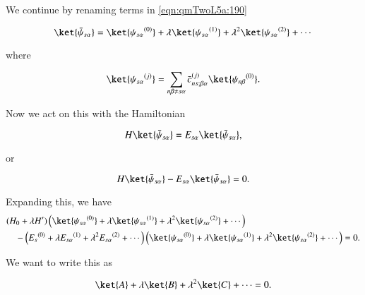
We continue by renaming terms in \ref{eqn:qmTwoL5a:190}

\begin{equation}\label{eqn:qmTwoL5a:300}
\ket{\bar{\psi}_{s \alpha}} 
=
\ket{{\psi_{s \alpha}}^{(0)}} 
+ 
\lambda \ket{{\psi_{s \alpha}}^{(1)}} 
+ 
\lambda^2 \ket{{\psi_{s \alpha}}^{(2)}} 
+ \cdots
\end{equation}

where

\begin{equation}\label{eqn:qmTwoL5a:320}
\ket{{\psi_{s \alpha}}^{(j)}} = \sum_{n\beta \ne s\alpha} {\bar{c}_{ns;\beta \alpha}}^{(j)} \ket{{\psi_{n \beta}}^{(0)}}.
\end{equation}

Now we act on this with the Hamiltonian

\begin{equation}\label{eqn:qmTwoL5a:340}
H \ket{\bar{\psi}_{s \alpha}} = E_{s \alpha} \ket{\bar{\psi}_{s \alpha}},
\end{equation}

or

\begin{equation}\label{eqn:qmTwoL5a:360}
H \ket{\bar{\psi}_{s \alpha}} - E_{s \alpha} \ket{\bar{\psi}_{s \alpha}} = 0.
\end{equation}

Expanding this, we have
\begin{equation}\label{eqn:qmTwoL5a:380}
\begin{aligned}
&(H_0 + \lambda H') 
\left(
\ket{{\psi_{s \alpha}}^{(0)}} 
+ 
\lambda \ket{{\psi_{s \alpha}}^{(1)}} 
+ 
\lambda^2 \ket{{\psi_{s \alpha}}^{(2)}} 
+ \cdots
\right) \\
&\quad - 
\left( {E_s}^{(0)} + \lambda {E_{s \alpha}}^{(1)} + \lambda^2 {E_{s \alpha}}^{(2)} + \cdots \right)
\left(
\ket{{\psi_{s \alpha}}^{(0)}} 
+ 
\lambda \ket{{\psi_{s \alpha}}^{(1)}} 
+ 
\lambda^2 \ket{{\psi_{s \alpha}}^{(2)}} 
+ \cdots
\right)
= 0.
\end{aligned}
\end{equation}

We want to write this as

\begin{equation}\label{eqn:qmTwoL5a:400}
\ket{A} + \lambda \ket{B} + \lambda^2 \ket{C} + \cdots = 0.
\end{equation}

